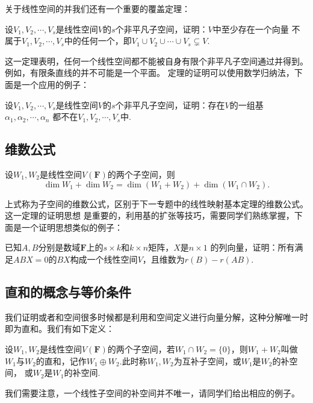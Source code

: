 关于线性空间的并我们还有一个重要的覆盖定理：
\begin{theorem}
	设$V_1,V_2,\cdots,V_s$是线性空间$V$的$s$个非平凡子空间，证明：$V$中至少存在一个向量
	不属于$V_1,V_2,\cdots,V_s$中的任何一个，即$V_1 \cup V_2 \cup \cdots \cup V_s\subsetneq V.$
\end{theorem}
这一定理表明，任何一个线性空间都不能被自身有限个非平凡子空间通过并得到。例如，有限条直线的并不可能是一个平面。
定理的证明可以使用数学归纳法，下面是一个应用的例子：
\begin{example}
	设$V_1,V_2,\cdots,V_s$是线性空间$V$的$s$个非平凡子空间，证明：存在$V$的一组基$\alpha_1,\alpha_2,\cdots,\alpha_n$
	都不在$V_1,V_2,\cdots,V_s$中.
\end{example}
\subsection{维数公式}
\begin{theorem}
	设$W_1,W_2$是线性空间$V(\mathbf{F})$的两个子空间，则
	$$\dim W_1+\dim W_2=\dim(W_1+W_2)+\dim(W_1\cap W_2).$$
\end{theorem}
上式称为子空间的维数公式，区别于下一专题中的线性映射基本定理的维数公式。这一定理的证明思想
是重要的，利用基的扩张等技巧，需要同学们熟练掌握，下面是一个证明思想类似的例子：
\begin{example}
	已知$A,B$分别是数域$\mathbf{F}$上的$s \times k$和$k \times n$矩阵，$X$是$n \times 1$
	的列向量，证明：所有满足$ABX=0$的$BX$构成一个线性空间$V$，且维数为$r(B)-r(AB).$
\end{example}
\subsection{直和的概念与等价条件}
我们证明或者和空间很多时候都是利用和空间定义进行向量分解，这种分解唯一时即为直和。我们有如下定义：
\begin{definition}
	设$W_1,W_2$是线性空间$V(\mathbf{F})$的两个子空间，若$W_1 \cap W_2=\{0\}$，则$W_1+W_2$叫做
	$W_1$与$W_2$的直和，记作$W_1\oplus W_2$.此时称$W_1,W_2$为互补子空间，或$W_1$是$W_2$的补空间，
	或$W_2$是$W_1$的补空间.
\end{definition}
我们需要注意，一个线性子空间的补空间并不唯一，请同学们给出相应的例子。

